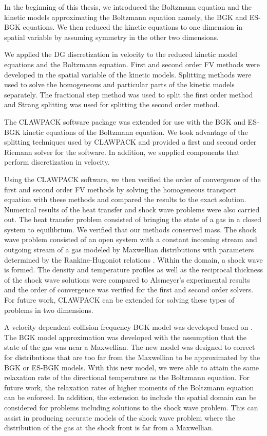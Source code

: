 In the beginning of this thesis, we introduced the Boltzmann equation and the kinetic models approximating the Boltzmann equation namely, the BGK and ES-BGK equations. We then reduced the kinetic equations to one dimension in spatial variable by assuming symmetry in the other two dimensions.

We applied the DG discretization in velocity to the reduced kinetic model equations and the Boltzmann equation. First and second order FV methods were developed in the spatial variable of the kinetic models. Splitting methods were used to solve the homogeneous and particular parts of the kinetic models separately. The fractional step method was used to split the first order method and Strang splitting was used for splitting the second order method.

The CLAWPACK software package was extended for use with the BGK and ES-BGK kinetic equations of the Boltzmann equation. We took advantage of the splitting techniques used by CLAWPACK and provided a first and second order Riemann solver for the software. In addition, we supplied components that perform discretization in velocity.

Using the CLAWPACK software, we then verified the order of convergence of the first and second order FV methods by solving the homogeneous transport equation with these methods and compared the results to the exact solution. Numerical results of the heat transfer and shock wave problems were also carried out. The heat transfer problem consisted of bringing the state of a gas in a closed system to equilibrium. We verified that our methods conserved mass. The shock wave problem consisted of an open system with a constant incoming stream and outgoing stream of a gas modeled by Maxwellian distributions with parameters determined by the Rankine-Hugoniot relations \cite{roshko}. Within the domain, a shock wave is formed. The density and temperature profiles as well as the reciprocal thickness of the shock wave solutions were compared to Alsmeyer's \cite{alsmeyer} experimental results and the order of convergence was verified for the first and second order solvers. For future work, CLAWPACK can be extended for solving these types of problems in two dimensions.

A velocity dependent collision frequency BGK model was developed based on \cite{tch}. The BGK model approximation was developed with the assumption that the state of the gas was near a Maxwellian. The new model was designed to correct for distributions that are too far from the Maxwellian to be approximated by the BGK or ES-BGK models. With this new model, we were able to attain the same relaxation rate of the directional temperature as the Boltzmann equation. For future work, the relaxation rates of higher moments of the Boltzmann equation can be enforced. In addition, the extension to include the spatial domain can be considered for problems including solutions to the shock wave problem. This can assist in producing accurate models of the shock wave problem where the distribution of the gas at the shock front is far from a Maxwellian.
